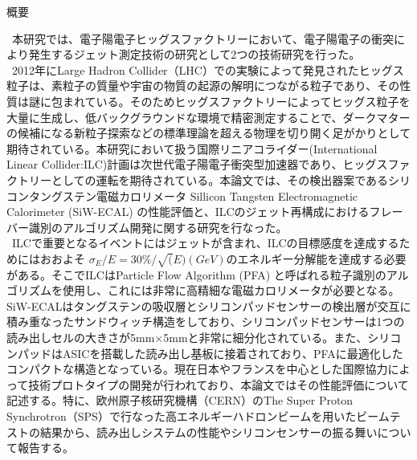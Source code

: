 
\begin{center}
\iffalse
\thispagestyle{empty}
{\Large 修士論文テンプレート}\\
九州大学大学院 理学府 物理学専攻 \\ 粒子物理学分野 素粒子実験研究室 \\
素粒子\ 実験 \\[1ex] 指導教員\ 氏\ 名\\ 　 \\
\fi
{\huge 概要}\\
\end{center}
\ 本研究では、電子陽電子ヒッグスファクトリーにおいて、電子陽電子の衝突により発生するジェット測定技術の研究として2つの技術研究を行った。\\
\ 2012年にLarge Hadron Collider（LHC）での実験によって発見されたヒッグス粒子は、素粒子の質量や宇宙の物質の起源の解明につながる粒子であり、その性質は謎に包まれている。そのためヒッグスファクトリーによってヒッグス粒子を大量に生成し、低バックグラウンドな環境で精密測定することで、ダークマターの候補になる新粒子探索などの標準理論を超える物理を切り開く足がかりとして期待されている。本研究において扱う国際リニアコライダー(International Linear Collider:ILC)計画は次世代電子陽電子衝突型加速器であり、ヒッグスファクトリーとしての運転を期待されている。本論文では、その検出器案であるシリコンタングステン電磁カロリメータ Sillicon Tangsten Electromagnetic Calorimeter (SiW-ECAL) の性能評価と、ILCのジェット再構成におけるフレーバー識別のアルゴリズム開発に関する研究を行なった。\\
\ ILCで重要となるイベントにはジェットが含まれ、ILCの目標感度を達成するためにはおおよそ ${\sigma}_E /E = 30\%/\sqrt(E)(GeV)$のエネルギー分解能を達成する必要がある。そこでILCはParticle Flow Algorithm (PFA) と呼ばれる粒子識別のアルゴリズムを使用し、これには非常に高精細な電磁カロリメータが必要となる。SiW-ECALはタングステンの吸収層とシリコンパッドセンサーの検出層が交互に積み重なったサンドウィッチ構造をしており、シリコンパッドセンサーは1つの読み出しセルの大きさが5mm$\times$5mmと非常に細分化されている。また、シリコンパッドはASICを搭載した読み出し基板に接着されており、PFAに最適化したコンパクトな構造となっている。現在日本やフランスを中心とした国際協力によって技術プロトタイプの開発が行われており、本論文ではその性能評価について記述する。特に、欧州原子核研究機構（CERN）のThe Super Proton Synchrotron（SPS）で行なった高エネルギーハドロンビームを用いたビームテストの結果から、読み出しシステムの性能やシリコンセンサーの振る舞いについて報告する。\\
